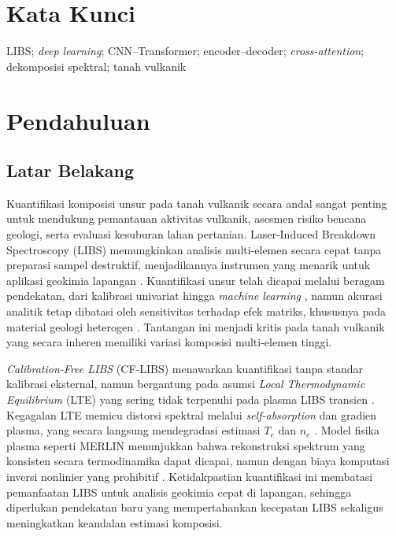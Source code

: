 \documentclass[12pt, a4paper]{article}
\begin{document}
\section{Kata Kunci}
LIBS; \textit{deep learning}; CNN–Transformer; encoder–decoder; \textit{cross-attention}; dekomposisi spektral; tanah vulkanik


\section{Pendahuluan}

\subsection{Latar Belakang}
Kuantifikasi komposisi unsur pada tanah vulkanik secara andal sangat penting untuk mendukung pemantauan aktivitas vulkanik, asesmen risiko bencana geologi, serta evaluasi kesuburan lahan pertanian. Laser-Induced Breakdown Spectroscopy (LIBS) memungkinkan analisis multi-elemen secara cepat tanpa preparasi sampel destruktif, menjadikannya instrumen yang menarik untuk aplikasi geokimia lapangan \citep{legnaioli2025, sawyers2025}. Kuantifikasi unsur telah dicapai melalui beragam pendekatan, dari kalibrasi univariat \citep{zhang2025} hingga \textit{machine learning} \citep{babos2024, manzoor2025}, namun akurasi analitik tetap dibatasi oleh sensitivitas terhadap efek matriks, khususnya pada material geologi heterogen \citep{hao2024, manelski2024}. Tantangan ini menjadi kritis pada tanah vulkanik yang secara inheren memiliki variasi komposisi multi-elemen tinggi.

\textit{Calibration-Free LIBS} (CF-LIBS) menawarkan kuantifikasi tanpa standar kalibrasi eksternal, namun bergantung pada asumsi \textit{Local Thermodynamic Equilibrium} (LTE) yang sering tidak terpenuhi pada plasma LIBS transien \citep{cristoforetti2010, zaitsev2024, bultel2025}. Kegagalan LTE memicu distorsi spektral melalui \textit{self-absorption} dan gradien plasma, yang secara langsung mendegradasi estimasi $T_e$ dan $n_e$ \citep{tang2024, hansen2021}. Model fisika plasma seperti MERLIN \citep{favre2025a} menunjukkan bahwa rekonstruksi spektrum yang konsisten secara termodinamika dapat dicapai, namun dengan biaya komputasi inversi nonlinier yang prohibitif \citep{favre2025b}. Ketidakpastian kuantifikasi ini membatasi pemanfaatan LIBS untuk analisis geokimia cepat di lapangan, sehingga diperlukan pendekatan baru yang mempertahankan kecepatan LIBS sekaligus meningkatkan keandalan estimasi komposisi.
\end{document}
